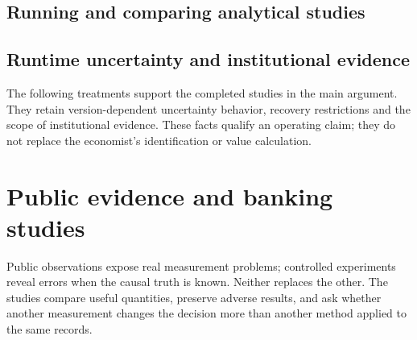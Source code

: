 \documentclass[11pt,a4paper,openany]{book}
\begin{document}
\chapter{Running and comparing analytical studies}









\chapter{Runtime uncertainty and institutional evidence}
The following treatments support the completed studies in the main argument.
They retain version-dependent uncertainty behavior, recovery restrictions
and the scope of institutional evidence. These facts qualify an operating
claim; they do not replace the economist's identification or value calculation.



\part{Public evidence and banking studies}
\label{reading:part-evidence}
Public observations expose real measurement problems; controlled
experiments reveal errors when the causal truth is known. Neither replaces
the other. The studies compare useful quantities, preserve adverse results,
and ask whether another measurement changes the decision more than another
method applied to the same records.



















\end{document}
